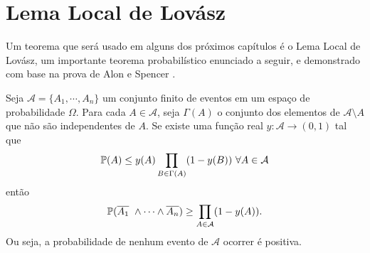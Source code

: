 

\section{Lema Local de Lovász}

Um teorema que será usado em alguns dos próximos capítulos é o Lema Local de Lovász, um importante teorema probabilístico enunciado a seguir, e demonstrado com base na prova de Alon e Spencer \cite{alon2004probabilistic}.

\begin{teorema}\label{LLL}
Seja $\mathcal{A} = \{A_1, \cdots, A_n\}$ um conjunto finito de eventos em um espaço de probabilidade $\Omega$. Para cada $A\in \mathcal{A}$, seja $\Gamma(A)$ o conjunto dos elementos de $\mathcal{A}\setminus A$ que não são independentes de $A$. Se existe uma função real $y : \mathcal{A} \rightarrow (0,1)$ tal que
\[\mathbb{P}(A)\leq y(A) \prod_{B\in \Gamma(A)}(1-y(B))\ \forall A\in \mathcal{A}\]
então 
\[\mathbb{P}(\overline{A_1}\ \wedge \cdots \wedge \overline{A_n}) \geq \prod_{A\in\mathcal{A}}(1-y(A)).\]
Ou seja, a probabilidade de nenhum evento de $\mathcal{A}$ ocorrer é positiva.
\end{teorema}

